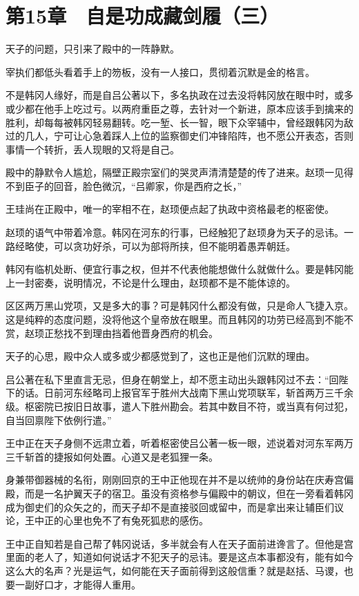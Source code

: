 \section{第15章　自是功成藏剑履（三）}

天子的问题，只引来了殿中的一阵静默。

宰执们都低头看着手上的笏板，没有一人接口，贯彻着沉默是金的格言。

不是韩冈人缘好，而是自吕公著以下，多名执政在过去没将韩冈放在眼中时，或多或少都在他手上吃过亏。以两府重臣之尊，去针对一个新进，原本应该手到擒来的胜利，却每每被韩冈轻易翻转。吃一堑、长一智，眼下众宰辅中，曾经跟韩冈为敌过的几人，宁可让心急着踩人上位的监察御史们冲锋陷阵，也不愿公开表态，否则事情一个转折，丢人现眼的又将是自己。

殿中的静默令人尴尬，隔壁正殿宗室们的哭灵声清清楚楚的传了进来。赵顼一见得不到臣子的回音，脸色微沉，“吕卿家，你是西府之长，”

王珪尚在正殿中，唯一的宰相不在，赵顼便点起了执政中资格最老的枢密使。

赵顼的语气中带着冷意。韩冈在河东的行事，已经触犯了赵顼身为天子的忌讳。一路经略使，可以贪功好杀，可以为部将所挟，但不能明着愚弄朝廷。

韩冈有临机处断、便宜行事之权，但并不代表他能想做什么就做什么。要是韩冈能上一封密奏，说明情况，不论是什么理由，赵顼都不是不能体谅的。

区区两万黑山党项，又是多大的事？可是韩冈什么都没有做，只是命人飞捷入京。这是纯粹的态度问题，没将他这个皇帝放在眼里。而且韩冈的功劳已经高到不能不赏，赵顼正愁找不到理由挡着他晋身西府的机会。

天子的心思，殿中众人或多或少都感觉到了，这也正是他们沉默的理由。

吕公著在私下里直言无忌，但身在朝堂上，却不愿主动出头跟韩冈过不去：“回陛下的话。日前河东经略司上报官军于胜州大战南下黑山党项联军，斩首两万三千余级。枢密院已按旧日故事，遣人下胜州勘会。若其中数目不符，或当真有何过犯，自当回禀陛下依例行遣。”

王中正在天子身侧不远肃立着，听着枢密使吕公著一板一眼，述说着对河东军两万三千斩首的捷报如何处置。心道又是老狐狸一条。

身兼带御器械的名衔，刚刚回京的王中正他现在并不是以统帅的身份站在庆寿宫偏殿，而是一名护翼天子的宿卫。虽没有资格参与偏殿中的朝议，但在一旁看着韩冈成为御史们的众矢之的，而天子却不是直接驳回或留中，而是拿出来让辅臣们议论，王中正的心里也免不了有兔死狐悲的感伤。

王中正自知若是自己帮了韩冈说话，多半就会有人在天子面前进谗言了。但他是宫里面的老人了，知道如何说话才不犯天子的忌讳。要是这点本事都没有，能有如今这么大的名声？光是运气，如何能在天子面前得到这般信重？就是赵括、马谡，也要一副好口才，才能得人重用。


